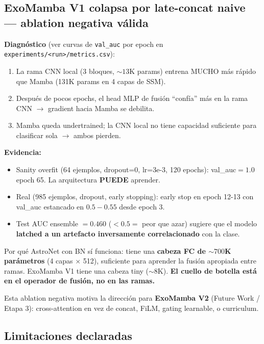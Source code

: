 \documentclass[11pt, a4paper]{article}
\begin{document}
\subsection{ExoMamba V1 colapsa por late-concat naive --- ablation negativa válida}
\label{sec:exomamba_negative}

\textbf{Diagnóstico} (ver curvas de \texttt{val\_auc} por epoch en \texttt{experiments/<run>/metrics.csv}):

\begin{enumerate}[leftmargin=*, topsep=0pt]
    \item La rama CNN local (3 bloques, $\sim 13$K params) entrena MUCHO más rápido que Mamba (131K params en 4 capas de SSM).
    \item Después de pocos epochs, el head MLP de fusión ``confía'' más en la rama CNN $\to$ gradient hacia Mamba se debilita.
    \item Mamba queda undertrained; la CNN local no tiene capacidad suficiente para clasificar sola $\to$ ambos pierden.
\end{enumerate}

\textbf{Evidencia:}
\begin{itemize}[leftmargin=*, topsep=0pt]
    \item Sanity overfit (64 ejemplos, dropout=0, lr=3e-3, 120 epochs): val\_auc$=1.0$ epoch 65. La arquitectura \textbf{PUEDE} aprender.
    \item Real (985 ejemplos, dropout, early stopping): early stop en epoch 12-13 con val\_auc estancado en $0.5\!-\!0.55$ desde epoch 3.
    \item Test AUC ensemble $= 0.460$ ($<0.5 =$ peor que azar) sugiere que el modelo \textbf{latched a un artefacto inversamente correlacionado} con la clase.
\end{itemize}

Por qué AstroNet con BN sí funciona: tiene una \textbf{cabeza FC de $\sim 700$K parámetros} (4 capas $\times$ 512), suficiente para aprender la fusión apropiada entre ramas. ExoMamba V1 tiene una cabeza tiny ($\sim 8$K). \textbf{El cuello de botella está en el operador de fusión, no en las ramas.}

Esta ablation negativa motiva la dirección para \textbf{ExoMamba V2} (Future Work / Etapa 3): cross-attention en vez de concat, FiLM, gating learnable, o curriculum.

\subsection{Limitaciones declaradas}
\end{document}
